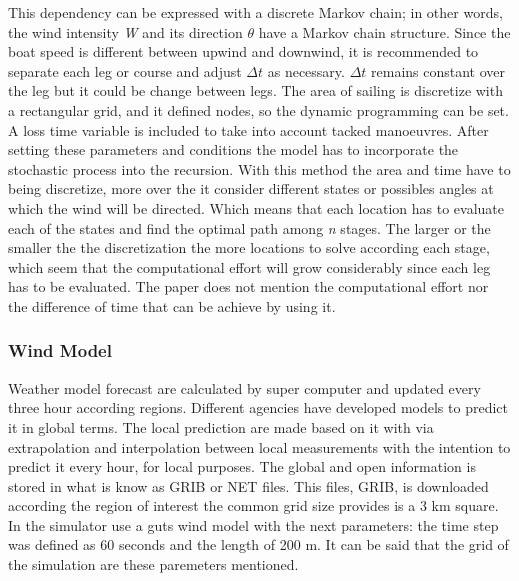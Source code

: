 This dependency can be expressed with a discrete Markov chain; in other words, the wind intensity \textit{W} and its direction $\theta$ have a Markov chain structure.  Since the boat speed is different  between upwind and downwind, it is recommended to separate each leg or course and adjust $\Delta t$ as necessary. $\Delta t$ remains constant over the leg but it could be change between legs.  %
The area of sailing is discretize with a rectangular grid, and it defined nodes, so the dynamic  programming can be set. A loss time variable is included to take into account tacked manoeuvres. After setting these parameters and conditions the model has to incorporate the stochastic process into the recursion. %
With this method the area and time have to being discretize, more over the it consider different states or possibles angles at which the wind will be directed. Which means that each location has to evaluate each of the states and find the optimal path among  \textit{n} stages.  The larger or the smaller the the discretization the more locations to solve according each stage, which seem that the computational effort will grow considerably since each leg has to be evaluated.  The paper does not mention the computational effort nor the difference of time that can be achieve by using it.
\subsubsection{Wind Model}
Weather model forecast are calculated  by super computer and updated every three hour according regions. Different agencies have developed models to predict it in global terms. The local prediction are made based on it with via extrapolation and interpolation between local measurements with the intention to predict it every hour, for local purposes. The global and open information is stored in what is know as GRIB or NET files. This files, GRIB, is downloaded according the region of interest the common grid size provides is a 3 km square. 
In \cite{binns2002development} the simulator use a guts wind model  with the next parameters: the time step was defined as 60 seconds and the length of 200 m. It can be said that the grid of the simulation are these paremeters mentioned.
